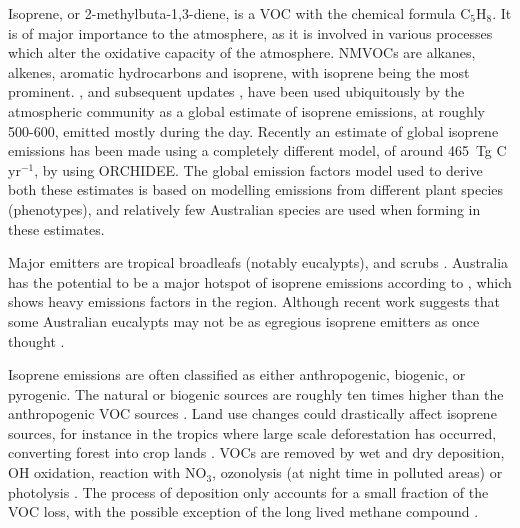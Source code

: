     Isoprene, or 2-methylbuta-1,3-diene, is a VOC with the chemical formula C$_5$H$_8$. 
    It is of major importance to the atmosphere, as it is involved in various processes which alter the oxidative capacity of the atmosphere.
    NMVOCs are alkanes, alkenes, aromatic hydrocarbons and isoprene, with isoprene being the most prominent.
    \cite{Guenther1995}, and subsequent updates \citep{Guenther2000,Guenther2006,Guenther2012}, have been used ubiquitously by the atmospheric community as a global estimate of isoprene emissions, at roughly 500-600\tgpyr, emitted mostly during the day.
    Recently an estimate of global isoprene emissions has been made using a completely different model, of around 465~Tg C yr$^{-1}$, by \cite{Messina2016} using ORCHIDEE.
    The global emission factors model used to derive both these estimates is based on modelling emissions from different plant species (phenotypes), and relatively few Australian species are used when forming in these estimates.
    
    Major emitters are tropical broadleafs (notably eucalypts), and scrubs \citep{Guenther2006, Arneth2008, Niinemets2010, Monks2015}.
    Australia has the potential to be a major hotspot of isoprene emissions according to \cite{Guenther2012}, which shows heavy emissions factors in the region.
    Although recent work suggests that some Australian eucalypts may not be as egregious isoprene emitters as once thought \citet{Emmerson2016}.
    
    Isoprene emissions are often classified as either anthropogenic, biogenic, or pyrogenic.
    The natural or biogenic sources are roughly ten times higher than the anthropogenic VOC sources \citep{Guenther2006, Kanakidou2005}.
    Land use changes could drastically affect isoprene sources, for instance in the tropics where large scale deforestation has occurred, converting forest into crop lands \citep{Kanakidou2005}.
    VOCs are removed by wet and dry deposition, OH oxidation, reaction with NO$_3$, ozonolysis (at night time in polluted areas) or photolysis \citep{AtkinsonArey2003, Brown2009}.
    The process of deposition only accounts for a small fraction of the VOC loss, with the possible exception of the long lived methane compound \citep{AtkinsonArey2003}.
    

